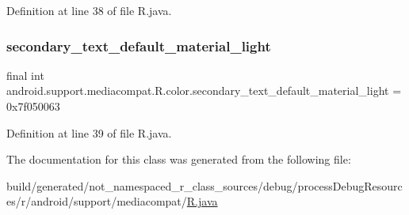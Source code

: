 Definition at line 38 of file R.\+java.

\mbox{\label{classandroid_1_1support_1_1mediacompat_1_1_r_1_1color_a300f378d96501458fb9fd01e2f4ea7aa}} 
\subsubsection{\texorpdfstring{secondary\_text\_default\_material\_light}{secondary\_text\_default\_material\_light}}
{\footnotesize\ttfamily final int android.\+support.\+mediacompat.\+R.\+color.\+secondary\+\_\+text\+\_\+default\+\_\+material\+\_\+light = 0x7f050063\hspace{0.3cm}{\ttfamily [static]}}



Definition at line 39 of file R.\+java.



The documentation for this class was generated from the following file\+:\begin{DoxyCompactItemize}
\item 
build/generated/not\+\_\+namespaced\+\_\+r\+\_\+class\+\_\+sources/debug/process\+Debug\+Resources/r/android/support/mediacompat/\mbox{\hyperlink{android_2support_2mediacompat_2_r_8java}{R.\+java}}\end{DoxyCompactItemize}
